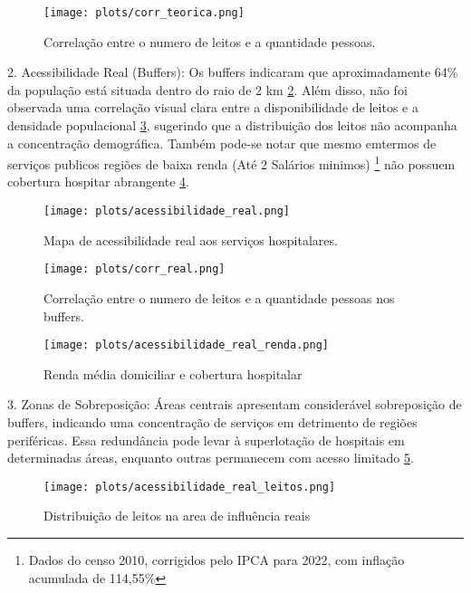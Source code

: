 \documentclass[
  8pt,
]{article}
\begin{document}
\begin{multicols}{2}
\begin{figure}[H]
    \centering
    \texttt{[image: plots/corr\_teorica.png]}
    \caption{Correlação entre o numero de leitos e a quantidade pessoas.}
    \label{fig:corr_teorica}
\end{figure}

2. Acessibilidade Real (Buffers): Os buffers indicaram que aproximadamente 64\% da população está situada dentro do raio de 2 km \cref{fig:acessibilidade_real}. Além disso, não foi observada uma correlação visual clara entre a disponibilidade de leitos e a densidade populacional \cref{fig:corr_real}, sugerindo que a distribuição dos leitos não acompanha a concentração demográfica. Também pode-se notar que mesmo emtermos de serviços publicos regiões de baixa renda (Até 2 Salários minimos) \footnote{Dados do censo 2010, corrigidos pelo IPCA para 2022, com inflação acumulada de 114,55\%} não possuem cobertura hospitar abrangente \cref{fig:acessibilidade_real_renda}.

\begin{figure}[H]
    \centering
    \texttt{[image: plots/acessibilidade\_real.png]}
    \caption{Mapa de acessibilidade real aos serviços hospitalares.}
    \label{fig:acessibilidade_real}
\end{figure}

\begin{figure}[H]
    \centering
    \texttt{[image: plots/corr\_real.png]}
    \caption{Correlação entre o numero de leitos e a quantidade pessoas nos buffers.}
    \label{fig:corr_real}
\end{figure}

\begin{figure}[H]
    \centering
    \texttt{[image: plots/acessibilidade\_real\_renda.png]}
    \caption{Renda média domiciliar e cobertura hospitalar}
    \label{fig:acessibilidade_real_renda}
\end{figure}

3. Zonas de Sobreposição: Áreas centrais apresentam considerável sobreposição de buffers, indicando uma concentração de serviços em detrimento de regiões periféricas. Essa redundância pode levar à superlotação de hospitais em determinadas áreas, enquanto outras permanecem com acesso limitado \ref{fig:acessibilidade_real_leitos}.

\begin{figure}[H]
    \centering
    \texttt{[image: plots/acessibilidade\_real\_leitos.png]}
    \caption{Distribuição de leitos na area de influência reais}
    \label{fig:acessibilidade_real_leitos}
\end{figure}



\end{multicols}
\end{document}
